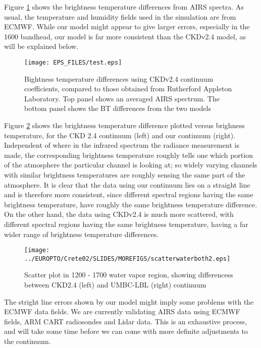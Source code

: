 \documentclass[11pt]{article}
\begin{document}
Figure \ref{fig:continuum_bt} shows the brightness temperature differences 
from AIRS spectra. As usual, the temperature and humidity fields used in the
simulation are from ECMWF. 
While our model might 
appear to give larger errors, especially in the 1600 \wn bandhead, our model 
is far more consistent than the CKDv2.4 model, as will be explained below.

\begin{figure}
\texttt{[image: EPS\_FILES/test.eps]}
  \caption{Bightness temperature differences using CKDv2.4 continuum 
   coefficients, compared to those obtained from Rutherford Appleton 
   Laboratory. Top panel shows an averaged AIRS spectrum. The bottom panel 
   shows the BT differences from the two models}
  \label{fig:continuum_bt} 
\end{figure} 

Figure \ref{fig:scatter} shows the brightness temperature difference plotted 
versus brighness temperature, for the CKD 2.4 continuum (left) and our 
continuum (right). Independent of where in the infrared spectrum the radiance
measurement is made, the corresponding brightness temperature roughly tells 
one which portion of the atmosphere the particular channel is looking at; so 
widely varying channels with similar brightness temperatures are roughly 
sensing the same part of the atmosphere. It is clear that the data using our 
continuum lies on a straight line and is therefore more consistent, since 
different spectral regions having the same brightness temperature, have 
roughly the same brightness temperature difference. On the other hand, the 
data using CKDv2.4 is much more scattered, 
with different spectral regions having the same brightness temperature, 
having a far wider range of brightness temperature differences.

\begin{figure}
\texttt{[image: ../EUROPTO/Crete02/SLIDES/MOREFIGS/scatterwaterboth2.eps]}
  \caption{Scatter plot in 1200 - 1700 \wn water vapor region, showing
           differencess between CKD2.4 (left) and UMBC-LBL (right) continuum}
  \label{fig:scatter} 
\end{figure} 

The stright line errors shown by our model might imply some problems with the 
ECMWF data fields. We are currently validating AIRS data using ECMWF fields,
ARM CART radiosondes and Lidar data. This is an exhaustive process, and will
take some time before we can come with more definite adjustments to the 
continuum.
\end{document}
